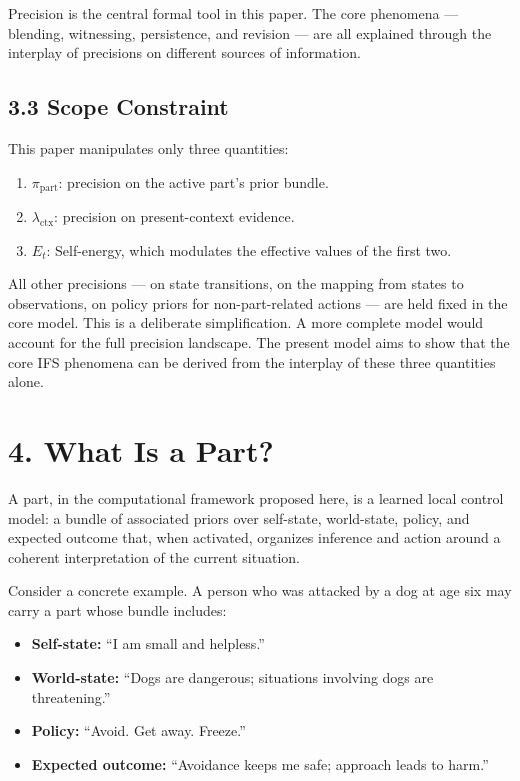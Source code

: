 \documentclass[11pt]{article}
\providecommand{\tightlist}{%
  \setlength{\itemsep}{0pt}\setlength{\parskip}{0pt}}
\begin{document}
Precision is the central formal tool in this paper. The core phenomena
--- blending, witnessing, persistence, and revision --- are all
explained through the interplay of precisions on different sources of
information.

\subsection{3.3 Scope Constraint}\label{scope-constraint}

This paper manipulates only three quantities:

\begin{enumerate}
\def\labelenumi{\arabic{enumi}.}
\tightlist
\item
  \(\pi_{\text{part}}\): precision on the active part's prior bundle.
\item
  \(\lambda_{\text{ctx}}\): precision on present-context evidence.
\item
  \(E_t\): Self-energy, which modulates the effective values of the
  first two.
\end{enumerate}

All other precisions --- on state transitions, on the mapping from
states to observations, on policy priors for non-part-related actions
--- are held fixed in the core model. This is a deliberate
simplification. A more complete model would account for the full
precision landscape. The present model aims to show that the core IFS
phenomena can be derived from the interplay of these three quantities
alone.

\section{4. What Is a Part?}\label{what-is-a-part}

A part, in the computational framework proposed here, is a learned local
control model: a bundle of associated priors over self-state,
world-state, policy, and expected outcome that, when activated,
organizes inference and action around a coherent interpretation of the
current situation.

Consider a concrete example. A person who was attacked by a dog at age
six may carry a part whose bundle includes:

\begin{itemize}
\tightlist
\item
  \textbf{Self-state:} ``I am small and helpless.''
\item
  \textbf{World-state:} ``Dogs are dangerous; situations involving dogs
  are threatening.''
\item
  \textbf{Policy:} ``Avoid. Get away. Freeze.''
\item
  \textbf{Expected outcome:} ``Avoidance keeps me safe; approach leads
  to harm.''
\end{itemize}
\end{document}
